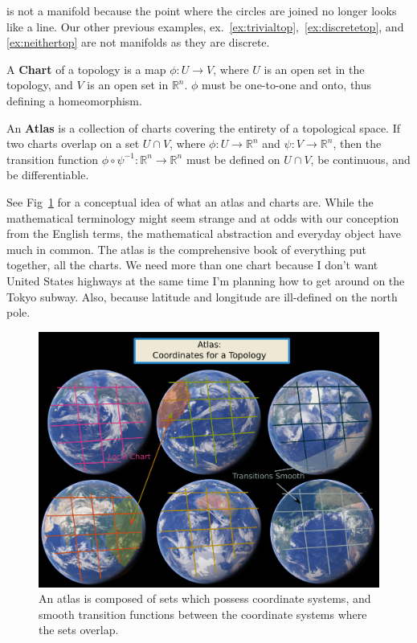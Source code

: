 \begin{center}
\end{center}

  is not a manifold because the point where the circles are joined no longer looks like a line.  Our other previous examples, ex.~\ref{ex:trivialtop},~\ref{ex:discretetop}, and \ref{ex:neithertop} are not manifolds as they are discrete.

\begin{definition}
  A \textbf{Chart} of a topology is a map $\phi: U \rightarrow V$, where $U$ is an open set in the topology, and $V$ is an open set in $\mathbb{R}^n$.   $\phi$ must be one-to-one and onto, thus defining a homeomorphism.
\end{definition}

\begin{definition}[Atlas]
  An \textbf{Atlas} is a collection of charts covering the entirety of a topological space.  If two charts overlap on a set $U \cap V$, where $\phi:U\rightarrow \mathbb{R}^n$ and $\psi:V\rightarrow \mathbb{R}^n$, then the transition function $\phi \circ \psi^{-1}: \mathbb{R}^n \rightarrow \mathbb{R}^n$ must be defined on $U\cap V$, be continuous, and be differentiable.
\end{definition}

See Fig~\ref{fig:atlas} for a conceptual idea of what an atlas and charts are.  While the mathematical terminology might seem strange and at odds with our conception from the English terms, the mathematical abstraction and everyday object have much in common.  The atlas is the comprehensive book of everything put together, all the charts.  We need more than one chart because I don't want United States highways at the same time I'm planning how to get around on the Tokyo subway.  Also, because latitude and longitude are ill-defined on the north pole.


\begin{figure}
  \includegraphics[width=\textwidth]{pics/atlas.png}
  \caption{An atlas is composed of sets which possess coordinate systems, and smooth transition functions between the coordinate systems where the sets overlap.}
    \label{fig:atlas}
\end{figure}
